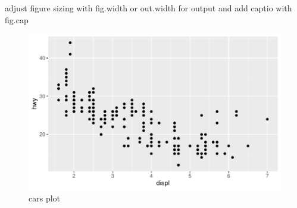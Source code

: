 \documentclass[
]{article}
\begin{document}
adjust figure sizing with fig.width or out.width for output and add
captio with fig.cap

\begin{figure}
\centering
\includegraphics{rmarkdown_tutorial_files/figure-latex/unnamed-chunk-34-1.pdf}
\caption{cars plot}
\end{figure}
\end{document}
